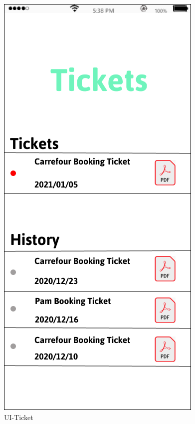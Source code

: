 \documentclass[a4paper,12pt]{report}
\begin{document}
\begin{figure}[H]
	\begin{minipage}[t]{0.56\linewidth}
		\centering
		\includegraphics[scale=0.5]{UI-Ticket.png}
		\caption{UI-Ticket}
		\label{UI-Ticket}
	\end{minipage}%
	\begin{minipage}[t]{0.56\linewidth}
		\centering

\end{minipage}
\end{figure}
\end{document}
